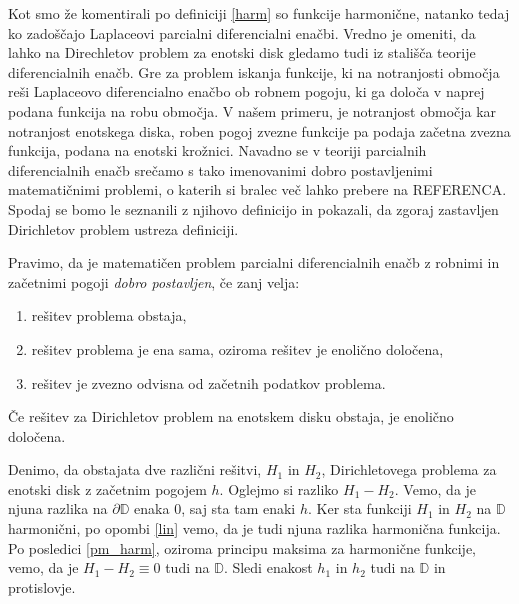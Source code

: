 \documentclass[mat1]{fmfdelo}
\begin{document}
    Kot smo že komentirali po definiciji \ref{harm} so funkcije harmonične, natanko tedaj ko zadoščajo Laplaceovi parcialni diferencialni enačbi.   
    Vredno je omeniti, da lahko na Direchletov problem za enotski disk gledamo tudi iz stališča teorije diferencialnih enačb. Gre za problem iskanja funkcije, ki na notranjosti območja reši Laplaceovo diferencialno enačbo ob robnem pogoju, ki ga določa v naprej podana funkcija na robu območja.     
    V našem primeru, je notranjost območja kar notranjost enotskega diska, roben pogoj zvezne funkcije pa podaja začetna zvezna funkcija, podana na enotski krožnici.
    Navadno se v teoriji parcialnih diferencialnih enačb srečamo s tako imenovanimi dobro postavljenimi matematičnimi problemi, o katerih si bralec več lahko prebere na REFERENCA.     
    Spodaj se bomo le seznanili z njihovo definicijo in pokazali, da zgoraj zastavljen Dirichletov problem ustreza definiciji. 

    \begin{definicija}[J. Hadamard 1902]
        Pravimo, da je matematičen problem parcialni diferencialnih enačb z robnimi in začetnimi pogoji \emph{dobro postavljen}, če zanj velja:
        \begin{enumerate}[label={\Alph*)}]
            \item rešitev problema obstaja,
            \item rešitev problema je ena sama, oziroma rešitev je enolično določena,
            \item rešitev je zvezno odvisna od začetnih podatkov problema.
        \end{enumerate}
    \end{definicija}

    \begin{lema}
        \label{enolicno}
        Če rešitev za Dirichletov problem na enotskem disku obstaja, je enolično določena.
    \end{lema}
    \begin{dokaz}
        Denimo, da obstajata dve različni rešitvi, $H_1$ in $H_2$, Dirichletovega problema za enotski disk z začetnim pogojem $h$.
        Oglejmo si razliko $H_1 - H_2$. Vemo, da je njuna razlika na $\partial \mathbb{D}$ enaka $0$, saj sta tam enaki $h$. Ker sta funkciji $H_1$ in $H_2$ na $\mathbb{D}$ harmonični, po opombi \ref{lin} vemo, da je tudi njuna razlika harmonična funkcija. 
        Po posledici \ref{pm_harm}, oziroma principu maksima za harmonične funkcije, vemo, da je $H_1 - H_2 \equiv 0$ tudi na $\mathbb{D}$. Sledi enakost $h_1$ in $h_2$ tudi na $\mathbb{D}$ in protislovje. 
    \end{dokaz}
    
\end{document}
